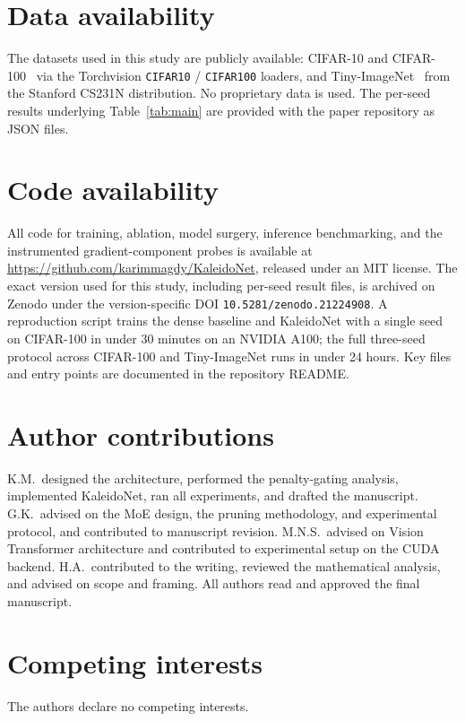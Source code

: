 \documentclass[fleqn,10pt]{article}
\begin{document}
\section*{Data availability}
The datasets used in this study are publicly available:
CIFAR-10 and CIFAR-100~\citep{krizhevsky2009learning} via the
Torchvision \verb|CIFAR10| / \verb|CIFAR100| loaders, and
Tiny-ImageNet~\citep{le2015tiny} from the Stanford CS231N
distribution. No proprietary data is used. The per-seed results
underlying Table~\ref{tab:main} are provided with the paper
repository as JSON files.

\section*{Code availability}
All code for training, ablation, model surgery, inference
benchmarking, and the instrumented gradient-component probes is
available at \url{https://github.com/karimmagdy/KaleidoNet},
released under an MIT license. The exact version used for this
study, including per-seed result files, is archived on Zenodo under
the version-specific DOI \texttt{10.5281/zenodo.21224908}. A reproduction
script trains the dense baseline and KaleidoNet with a single seed on
CIFAR-100 in under 30 minutes on an NVIDIA A100; the full three-seed
protocol across CIFAR-100 and Tiny-ImageNet runs in under 24 hours.
Key files and entry points are documented in the repository README.

\section*{Author contributions}
K.M.\ designed the architecture, performed the penalty-gating
analysis, implemented KaleidoNet, ran all experiments, and drafted
the manuscript. G.K.\ advised on the MoE design, the pruning
methodology, and experimental protocol, and contributed to manuscript
revision. M.N.S.\ advised on Vision Transformer architecture and contributed to experimental setup on the CUDA backend. H.A.\ contributed to the
writing, reviewed the mathematical analysis, and advised on scope and
framing. All authors read and approved the final manuscript.

\section*{Competing interests}
The authors declare no competing interests.
\end{document}
